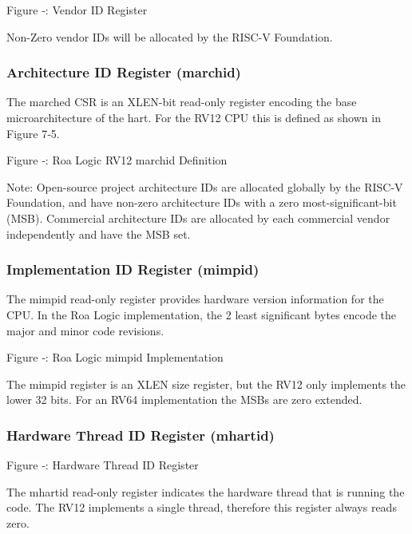 Figure ‑: Vendor ID Register

Non-Zero vendor IDs will be allocated by the RISC-V Foundation.

\subsubsection{Architecture ID Register
(marchid)}\label{architecture-id-register-marchid}

The marched CSR is an XLEN-bit read-only register encoding the base
microarchitecture of the hart. For the RV12 CPU this is defined as shown
in Figure 7‑5.

\missingfigure{}

\protect\hypertarget{_Ref367028846}{}{}Figure ‑: Roa Logic RV12 marchid
Definition

Note: Open-source project architecture IDs are allocated globally by the
RISC-V Foundation, and have non-zero architecture IDs with a zero
most-significant-bit (MSB). Commercial architecture IDs are allocated by
each commercial vendor independently and have the MSB set.

\subsubsection{Implementation ID Register
(mimpid)}\label{implementation-id-register-mimpid}

The mimpid read-only register provides hardware version information for
the CPU. In the Roa Logic implementation, the 2 least significant bytes
encode the major and minor code revisions.

\missingfigure{}

Figure ‑: Roa Logic mimpid Implementation

The mimpid register is an XLEN size register, but the RV12 only
implements the lower 32 bits. For an RV64 implementation the MSBs are
zero extended.

\subsubsection{Hardware Thread ID Register
(mhartid)}\label{hardware-thread-id-register-mhartid}

\missingfigure{}

Figure ‑: Hardware Thread ID Register

The mhartid read-only register indicates the hardware thread that is
running the code. The RV12 implements a single thread, therefore this
register always reads zero.

